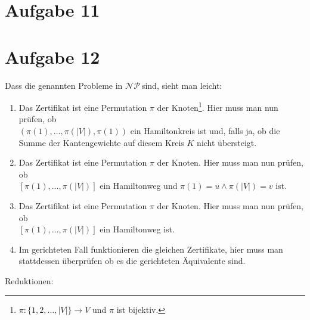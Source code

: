 \documentclass[a4paper,10pt,german]{scrartcl}
\newcommand{\NP}{\ensuremath{\mathcal{NP\ }}}
\begin{document}
\section*{Aufgabe 11}

\section*{Aufgabe 12}
Dass die genannten Probleme in \NP sind, sieht man leicht:
\begin{enumerate}
 \item Das Zertifikat ist eine Permutation $\pi$ der Knoten\footnote{$\pi:\{1,2,\dots,|V|\}\to V$ und $\pi$ ist bijektiv.}. Hier muss man nun prüfen, ob \\
 $(\pi(1),\dots,\pi(|V|),\pi(1))$ ein Hamiltonkreis ist und, falls ja, ob die Summe der Kantengewichte auf diesem Kreis $K$ nicht übersteigt.
 \item Das Zertifikat ist eine Permutation $\pi$ der Knoten\footnotemark[1]. Hier muss man nun prüfen, ob \\
 $[\pi(1),\dots,\pi(|V|)]$ ein Hamiltonweg und $\pi(1)=u\wedge \pi(|V|)=v$ ist.
 \item Das Zertifikat ist eine Permutation $\pi$ der Knoten\footnotemark[1]. Hier muss man nun prüfen, ob \\
 $[\pi(1),\dots,\pi(|V|)]$ ein Hamiltonweg ist.
 \item Im gerichteten Fall funktionieren die gleichen Zertifikate, hier muss man stattdessen überprüfen ob es die gerichteten Äquivalente sind.
\end{enumerate}
Reduktionen:
\end{document}
